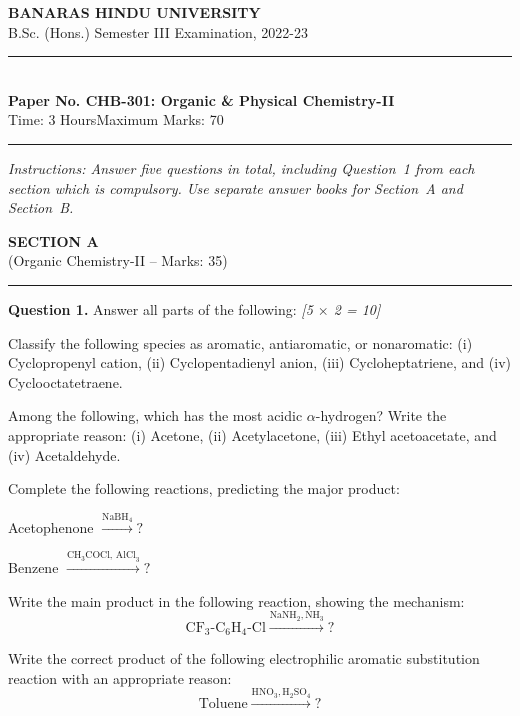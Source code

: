 \documentclass[11pt,a4paper]{article}
\newcommand{\pts}[1]{\hfill   \textit{[#1]}}
\begin{document}
\begin{center}
  {\large\bfseries BANARAS HINDU UNIVERSITY}\\[2pt]
  {\normalsize B.Sc. (Hons.) Semester III Examination, 2022-23}\\[6pt]
  \rule{0.8\linewidth}{0.5pt}\\[6pt]
  {\large\bfseries Paper No. CHB-301: Organic \& Physical Chemistry-II}\\[4pt]
  {\normalsize Time: 3 Hours\hfill Maximum Marks: 70}
\end{center}
\rule{\linewidth}{0.4pt}
\small



\noindent   \textit{Instructions: Answer five questions in total, including Question~1 from each section which is compulsory. Use separate answer books for Section~A and Section~B.}

\normalsize
\bigskip


\begin{center}
  {\large\bfseries SECTION A}\\[2pt]
  {\normalsize (Organic Chemistry-II -- Marks: 35)}
\end{center}
\rule{0.4\linewidth}{0.2pt}
\smallskip




\noindent   \textbf{Question 1.} Answer all parts of the following: \pts{5 $ \times$ 2 = 10}

\begin{parts}
  \item Classify the following species as aromatic, antiaromatic, or nonaromatic: (i) Cyclopropenyl cation, (ii) Cyclopentadienyl anion, (iii) Cycloheptatriene, and (iv) Cyclooctatetraene.
  \item Among the following, which has the most acidic $\alpha$-hydrogen? Write the appropriate reason: (i) Acetone, (ii) Acetylacetone, (iii) Ethyl acetoacetate, and (iv) Acetaldehyde.
  \item Complete the following reactions, predicting the major product:
  
\begin{parts}
    \item Acetophenone $\xrightarrow{ \text{NaBH}_4} ?$
    \item Benzene $\xrightarrow{ \text{CH}_3 \text{COCl, AlCl}_3} ?$
  \end{parts}
  \item Write the main product in the following reaction, showing the mechanism:
    \[  \text{CF}_3 \text{-C}_6 \text{H}_4 \text{-Cl} \xrightarrow{ \text{NaNH}_2,  \text{NH}_3} ? \]
  \item Write the correct product of the following electrophilic aromatic substitution reaction with an appropriate reason:
    \[  \text{Toluene} \xrightarrow{ \text{HNO}_3,  \text{H}_2 \text{SO}_4} ? \]
\end{parts}
\end{document}
